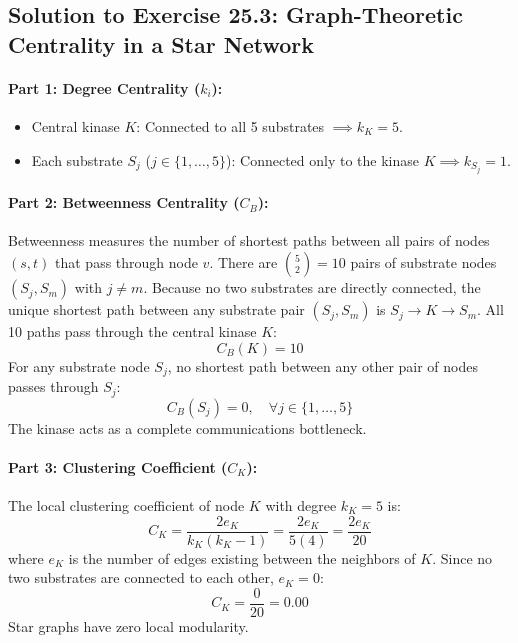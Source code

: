 \documentclass[11pt,twoside,openright]{book}
\begin{document}
\subsection*{Solution to Exercise 25.3: Graph-Theoretic Centrality in a Star Network}

\paragraph{Part 1: Degree Centrality ($k_i$):}
\begin{itemize}
    \item Central kinase $K$: Connected to all 5 substrates $\implies k_K = 5$.
    \item Each substrate $S_j$ ($j \in \{1, \dots, 5\}$): Connected only to the kinase $K \implies k_{S_j} = 1$.
\end{itemize}

\paragraph{Part 2: Betweenness Centrality ($C_B$):}
Betweenness measures the number of shortest paths between all pairs of nodes $(s, t)$ that pass through node $v$.
There are $\binom{5}{2} = 10$ pairs of substrate nodes $(S_j, S_m)$ with $j \neq m$.
Because no two substrates are directly connected, the unique shortest path between any substrate pair $(S_j, S_m)$ is $S_j \to K \to S_m$.
All 10 paths pass through the central kinase $K$:
\begin{equation*}
C_B(K) = 10
\end{equation*}
For any substrate node $S_j$, no shortest path between any other pair of nodes passes through $S_j$:
\begin{equation*}
C_B(S_j) = 0, \quad \forall j \in \{1, \dots, 5\}
\end{equation*}
The kinase acts as a complete communications bottleneck.

\paragraph{Part 3: Clustering Coefficient ($C_K$):}
The local clustering coefficient of node $K$ with degree $k_K = 5$ is:
\begin{equation*}
C_K = \frac{2 e_K}{k_K(k_K - 1)} = \frac{2 e_K}{5(4)} = \frac{2 e_K}{20}
\end{equation*}
where $e_K$ is the number of edges existing between the neighbors of $K$. Since no two substrates are connected to each other, $e_K = 0$:
\begin{equation*}
C_K = \frac{0}{20} = \mathbf{0.00}
\end{equation*}
Star graphs have zero local modularity.
\end{document}
